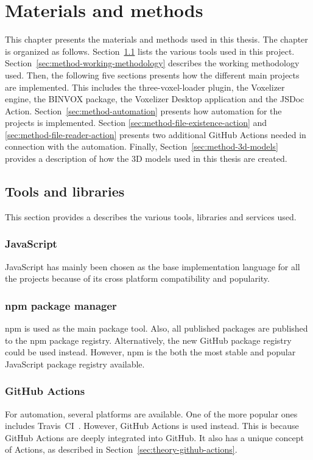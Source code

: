 \chapter[Method]{Materials and methods}
This chapter presents the materials and methods used in this thesis. The chapter is organized as follows. Section~\ref{sec:method-tools-and-libraries} lists the various tools used in this project. Section~\ref{sec:method-working-methodology} describes the working methodology used. Then, the following five sections presents how the different main projects are implemented. This includes the three-voxel-loader plugin, the Voxelizer engine, the BINVOX package, the Voxelizer Desktop application and the JSDoc Action. Section~\ref{sec:method-automation} presents how automation for the projects is implemented. Section \ref{sec:method-file-existence-action} and \ref{sec:method-file-reader-action} presents two additional GitHub Actions needed in connection with the automation. Finally, Section~\ref{sec:method-3d-models} provides a description of how the 3D models used in this thesis are created.


\section{Tools and libraries}
\label{sec:method-tools-and-libraries}
This section provides a describes the various tools, libraries and services used.

\subsection{JavaScript}
JavaScript has mainly been chosen as the base implementation language for all the projects because of its cross platform compatibility and popularity.

\subsection{npm package manager}
npm is used as the main package tool. Also, all published packages are published to the npm package registry. Alternatively, the new GitHub package registry could be used instead. However, npm is the both the most stable and popular JavaScript package registry available.

\subsection{GitHub Actions}
For automation, several platforms are available. One of the more popular ones includes Travis~CI~\cite{travis-ci}. However, GitHub Actions is used instead. This is because GitHub Actions are deeply integrated into GitHub. It also has a unique concept of Actions, as described in Section~\ref{sec:theory-github-actions}.

